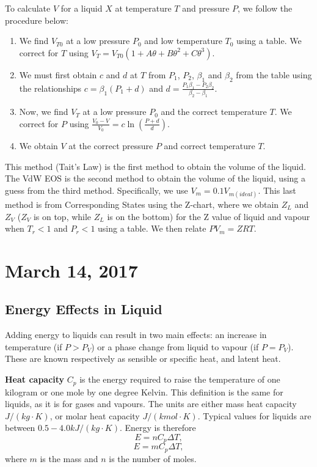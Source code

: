 \documentclass[11pt]{article}
\theoremstyle{plain} %
\theoremstyle{definition}
\theoremstyle{example}
\theoremstyle{remark}
\begin{document}
To calculate $V$ for a liquid $X$ at temperature $T$ and pressure $P$, we follow the procedure below:
\begin{enumerate}
	\item We find $V_{T0}$ at a low pressure $P_0$ and low temperature $T_0$ using a table. We correct for $T$ using $V_T= V_{T0}(1+A\theta + B\theta^2+C\theta^3)$. 
	\item We must first obtain $c$ and $d$ at $T$ from $P_1$, $P_2$, $\beta_1$ and $\beta_2$ from the table using the relationships $c = \beta_1(P_1+d)$ and $d = \frac{P_1\beta_1-P_2\beta_2}{\beta_2-\beta_1}$.
	\item Now, we find $V_T$ at a low pressure $P_0$ and the correct temperature $T$. We correct for $P$ using $\frac{V_0-V}{V_0} = c\ln\left(\frac{P+d}{d}\right)$. 
	\item We obtain $V$ at the correct pressure $P$ and correct temperature $T$. 
\end{enumerate}
This method (Tait's Law) is the first method to obtain the volume of the liquid.
The VdW EOS is the second method to obtain the volume of the liquid, using a guess from the third method. Specifically, we use $V_m = 0.1V_{m(ideal)}$. This last method is from Corresponding States using the Z-chart, where we obtain $Z_L$ and $Z_V$ ($Z_V$ is on top, while $Z_L$ is on the bottom) for the Z value of liquid and vapour when $T_r<1$ and $P_r<1$ using a table. We then relate $PV_m = ZRT$. 



\section{March 14, 2017}
\subsection{Energy Effects in Liquid}

Adding energy to liquids can result in two main effects: an increase in temperature (if $P > P_V$) or a phase change from liquid to vapour (if $P = P_V$). These are known respectively as sensible or specific heat, and latent heat. 

\textbf{Heat capacity} $C_p$ is the energy required to raise the temperature of one kilogram or one mole by one degree Kelvin. This definition is the same for liquids, as it is for gases and vapours. The units are either mass heat capacity $J/(kg\cdot K)$, or molar heat capacity $J/(kmol\cdot K)$. Typical values for liquids are between $0.5-4.0 kJ/(kg\cdot K)$. Energy is therefore
$$E = nC_p\Delta T,$$
$$E=mC_p\Delta T,$$
where $m$ is the mass and $n$ is the number of moles. 
\end{document}
